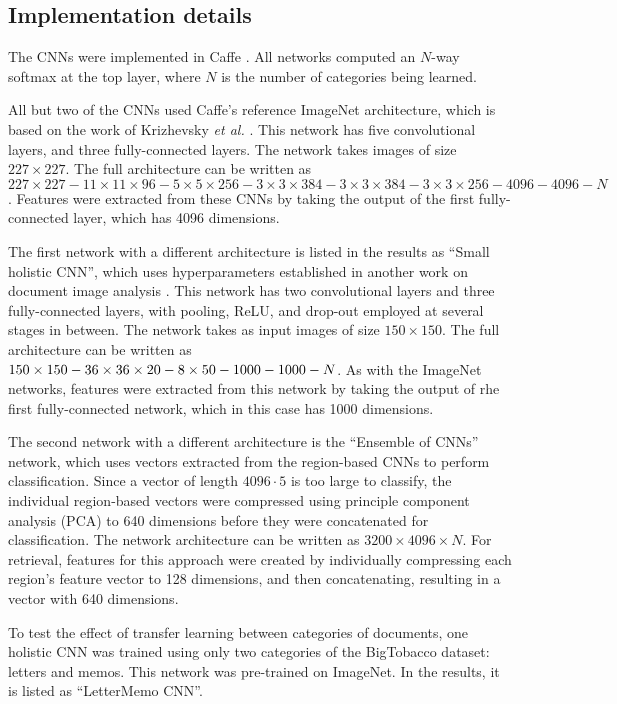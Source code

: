 \documentclass[conference]{IEEEtran_suppress}
\begin{document}
\subsection{Implementation details}

The CNNs were implemented in Caffe \cite{Jia13caffe}. All networks computed an $N$-way softmax at the top layer, where $N$ is the number of categories being learned. 

All but two of the CNNs used Caffe's reference ImageNet architecture, which is based on the work of Krizhevsky {\em et al.} \cite{kriz}. This network has five convolutional layers, and three fully-connected layers. The network takes images of size $227\times227$. The full architecture can be written as $227\times227 - 11\times11\times96 - 5\times5\times256 - 3\times3\times384 - 3\times3\times384 - 3\times3\times256 - 4096 - 4096 - N$. Features were extracted from these CNNs by taking the output of the first fully-connected layer, which has 4096 dimensions.

The first network with a different architecture is listed in the results as ``Small holistic CNN'', which uses hyperparameters established in another work on document image analysis \cite{lekang}. This network has two convolutional layers and three fully-connected layers, with pooling, ReLU, and drop-out employed at several stages in between. The network takes as input images of size $150\times150$. The full architecture can be written as $150\times150-36\times36\times20-8\time8\times50-1000-1000-N$. As with the ImageNet networks, features were extracted from this network by taking the output of rhe first fully-connected network, which in this case has 1000 dimensions. 

The second network with a different architecture is the ``Ensemble of CNNs'' network, which uses vectors extracted from the region-based CNNs to perform classification. Since a vector of length $4096 \cdot 5$ is too large to classify, the individual region-based vectors were compressed using principle component analysis (PCA) to 640 dimensions before they were concatenated for classification. The network architecture can be written as $3200 \times 4096 \times N$. For retrieval, features for this approach were created by individually compressing each region's feature vector to 128 dimensions, and then concatenating, resulting in a vector with 640 dimensions.

To test the effect of transfer learning between categories of documents, one holistic CNN was trained using only two categories of the BigTobacco dataset: letters and memos. This network was pre-trained on ImageNet. In the results, it is listed as ``LetterMemo CNN''.
\end{document}

